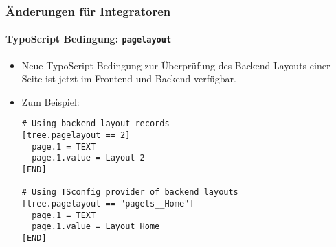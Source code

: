 %

\begin{frame}[fragile]
	\frametitle{Änderungen für Integratoren}
	\framesubtitle{TypoScript Bedingung: \texttt{pagelayout}}

	\lstset{basicstyle=\tiny\ttfamily}

	\begin{itemize}
		\item Neue TypoScript-Bedingung zur Überprüfung des Backend-Layouts einer Seite
			ist jetzt im Frontend und Backend verfügbar.
		\item Zum Beispiel:
\begin{lstlisting}
# Using backend_layout records
[tree.pagelayout == 2]
  page.1 = TEXT
  page.1.value = Layout 2
[END]

# Using TSconfig provider of backend layouts
[tree.pagelayout == "pagets__Home"]
  page.1 = TEXT
  page.1.value = Layout Home
[END]
\end{lstlisting}

	\end{itemize}
\end{frame}

